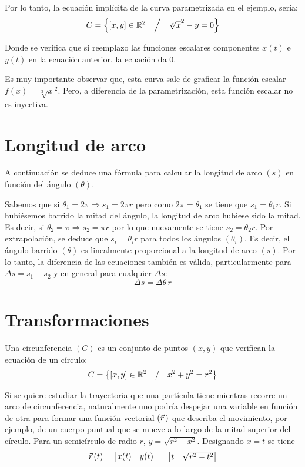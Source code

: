 \documentclass[a5paper,12pt,twoside]{book}
\begin{document}
Por lo tanto, la ecuación implícita de la curva parametrizada en el ejemplo, sería:
  \[ C = \left\{ [x,y] \in \mathbb{R}^2 \quad \Big/ \quad \sqrt[3]{x}^2 -y=0 \right\} \]

Donde se verifica que si reemplazo las funciones escalares componentes $x(t)$ e $y(t)$ en la ecuación anterior, la ecuación da 0.

Es muy importante observar que, esta curva sale de graficar la función escalar $f(x) = \sqrt[3]{x}^2$.
Pero, a diferencia de la parametrización, esta función escalar no es inyectiva.

\section{Longitud de arco}
\label{A:arcLength}

A continuación se deduce una fórmula para calcular la longitud de arco $(s)$ en función del ángulo $(\theta)$.

\begin{center}
    \def\svgwidth{0.4\linewidth}
    
\end{center}

Sabemos que si $\theta_1 = 2\pi \Rightarrow s_1 = 2 \pi r$ pero como $2 \pi = \theta_1$ se tiene que $s_1= \theta_1 r$. Si hubiésemos barrido la mitad del ángulo, la longitud de arco hubiese sido la mitad. Es decir, si $\theta_2 = \pi \Rightarrow s_2 = \pi r$ por lo que nuevamente se tiene $s_2= \theta_2 r$. Por extrapolación, se deduce que $s_i = \theta_i r$ para todos los ángulos $(\theta_i)$. Es decir, el ángulo barrido $(\theta)$ es linealmente proporcional a la longitud de arco $(s)$. Por lo tanto, la diferencia de las ecuaciones también es válida, particularmente para $\Delta s = s_1-s_2$ y en general para cualquier $\Delta s$:
\[
  \Delta s = \Delta \theta \, r
\]

\section{Transformaciones}

Una circunferencia $(C)$ es un conjunto de puntos $(x,y)$ que verifican la ecuación de un círculo:
\[
    C = \left\{ [x,y] \in \mathbb{R}^2 \quad / \quad x^2 + y^2 = r^2 \right\}
\]

Si se quiere estudiar la trayectoria que una partícula tiene mientras recorre un arco de circunferencia, naturalmente uno podría despejar una variable en función de otra para formar una función vectorial $(\vec{r}\hspace{0.05cm})$ que describa el movimiento, por ejemplo, de un cuerpo puntual que se mueve a lo largo de la mitad superior del círculo.
Para un semicírculo de radio $r$, $y = \sqrt{r^2 - x^2}$.
Designando $x = t$ se tiene
\[
    \vec{r}\hspace{0.05cm}(t) = \begin{bmatrix} x(t) & y(t) \end{bmatrix} = \begin{bmatrix} t & \sqrt{r^2-t^2} \end{bmatrix}
\]
\end{document}
